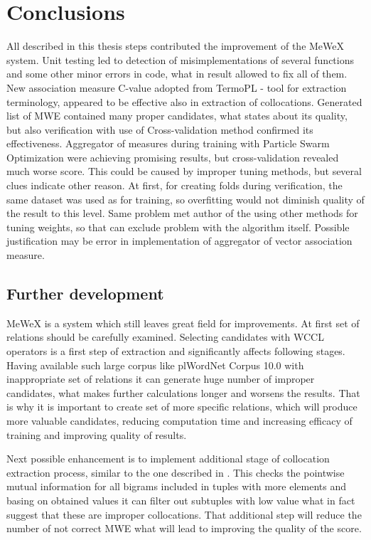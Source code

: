 \chapter{Conclusions}

All described in this thesis steps contributed the improvement of the MeWeX system. Unit testing led to detection of 
misimplementations of several functions and some other minor errors in code, what in result allowed to fix all of them. 
New association measure C-value adopted from TermoPL \cite{termopl} - tool for extraction terminology, appeared to be effective also in extraction of collocations. 
Generated list of MWE contained many proper candidates, what states about its quality, but also verification with use of Cross-validation 
method confirmed its effectiveness. Aggregator of measures during training with Particle Swarm Optimization were achieving promising results, 
but cross-validation revealed much worse score. This could be caused by improper tuning methods, but several clues indicate other reason. 
At first, for creating folds during verification, the same dataset was used as for training, so overfitting would not diminish quality of 
the result to this level. Same problem met author of the \cite{mgr} using other methods for tuning weights, so that can exclude 
problem with the algorithm itself. Possible justification may be error in implementation of aggregator of vector association measure.

\section{Further development}
MeWeX is a system which still leaves great field for improvements. At first set of relations should be carefully examined. 
Selecting candidates with WCCL operators is a first step of extraction and significantly affects following stages. 
Having available such large corpus like plWordNet Corpus 10.0 with inappropriate set of relations it can generate huge number of improper candidates, 
what makes further calculations longer and worsens the results. That is why it is important to create set of more specific relations, 
which will produce more valuable candidates, reducing computation time and increasing efficacy of training and improving quality of results.

Next possible enhancement is to implement additional stage of collocation extraction process, similar to the one described in \cite{termopl}.
This checks the pointwise mutual information for all bigrams included in tuples with more elements and basing on obtained values it can 
filter out subtuples with low value what in fact suggest that these are improper collocations. That additional step will reduce the number of 
not correct MWE what will lead to improving the quality of the score.

